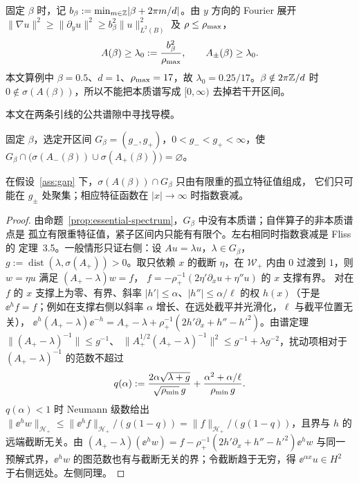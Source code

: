 固定 $\beta$ 时，记 $b_\beta:=\min_{m\in\mathbb{Z}}\lvert\beta+2\pi m/d\rvert$。由 $y$ 方向的
Fourier 展开 $\lVert\nabla u\rVert^2\geq\lVert\partial_yu\rVert^2\geq b_\beta^2\lVert u\rVert_{L^2(B)}^2$
及 $\rho\leq\rho_{\max}$，
\begin{align}
  A(\beta)\geq\lambda_0:=\frac{b_\beta^2}{\rho_{\max}},\qquad A_\pm(\beta)\geq\lambda_0 .
  \label{eq:spectral-bottom}
\end{align}
本文算例中 $\beta=0.5$、$d=1$、$\rho_{\max}=17$，故 $\lambda_0=0.25/17$。$\beta\notin2\pi\mathbb{Z}/d$
时 $0\notin\sigma(A(\beta))$，所以不能把本质谱写成 $[0,\infty)$ 去掉若干开区间。

本文在两条引线的公共谱隙中寻找导模。

\begin{assumption}[公共谱隙]
  \label{ass:gap}
  固定 $\beta$，选定开区间 $G_\beta=(g_-,g_+)$，$0<g_-<g_+<\infty$，使
  $G_\beta\cap\bigl(\sigma(A_-(\beta))\cup\sigma(A_+(\beta))\bigr)=\varnothing$。
\end{assumption}

\begin{proposition}[谱隙中的离散谱]
  \label{prop:discrete-spectrum-in-gap}
  在假设~\ref{ass:gap} 下，$\sigma(A(\beta))\cap G_\beta$ 只由有限重的孤立特征值组成，
  它们只可能在 $g_\pm$ 处聚集；相应特征函数在 $|x|\to\infty$ 时指数衰减。
\end{proposition}

\begin{proof}
  由命题~\ref{prop:essential-spectrum}，$G_\beta$ 中没有本质谱；自伴算子的非本质谱点是
  孤立有限重特征值，紧子区间内只能有有限个。左右相同时指数衰减是 Fliss 的
  定理~3.5\cite{Fliss2013}。一般情形只证右侧：设 $Au=\lambda u$，$\lambda\in G_\beta$，
  $g:=\operatorname{dist}(\lambda,\sigma(A_+))>0$。取只依赖 $x$ 的截断 $\eta$，在
  $\mathcal W_+$ 内由 $0$ 过渡到 $1$，则 $w=\eta u$ 满足 $(A_+-\lambda)w=f$，
  $f=-\rho_+^{-1}(2\eta'\partial_xu+\eta''u)$ 的 $x$ 支撑有界。
  对在 $f$ 的 $x$ 支撑上为零、有界、斜率
  $\lvert h'\rvert\leq\alpha$、$\lvert h''\rvert\leq\alpha/\ell$ 的权 $h(x)$（于是
  $\ee^hf=f$；例如在支撑右侧以斜率 $\alpha$ 增长、在远处截平并光滑化，$\ell$ 与截平位置无关），
  $\ee^{h}(A_+-\lambda)\ee^{-h}=A_+-\lambda+\rho_+^{-1}(2h'\partial_x+h''-h'^2)$。由谱定理
  $\lVert(A_+-\lambda)^{-1}\rVert\leq g^{-1}$、
  $\lVert A_+^{1/2}(A_+-\lambda)^{-1}\rVert^2\leq g^{-1}+\lambda g^{-2}$，扰动项相对于
  $(A_+-\lambda)^{-1}$ 的范数不超过
  \begin{align}
    q(\alpha):=\frac{2\alpha\sqrt{\lambda+g}}{\sqrt{\rho_{\min}}\,g}
    +\frac{\alpha^2+\alpha/\ell}{\rho_{\min}\,g}.
    \label{eq:decay-condition}
  \end{align}
  $q(\alpha)<1$ 时 Neumann 级数给出 $\lVert\ee^{h}w\rVert_{\mathcal H_+}\leq
  \lVert\ee^hf\rVert_{\mathcal H_+}/(g(1-q))=\lVert f\rVert_{\mathcal H_+}/(g(1-q))$，且界与
  $h$ 的远端截断无关。由 $(A_+-\lambda)(\ee^hw)=f-\rho_+^{-1}(2h'\partial_x+h''-h'^2)\ee^hw$
  与同一预解式界，$\ee^hw$ 的图范数也有与截断无关的界；令截断趋于无穷，得
  $\ee^{\alpha x}u\in H^2$ 于右侧远处。左侧同理。
\end{proof}

